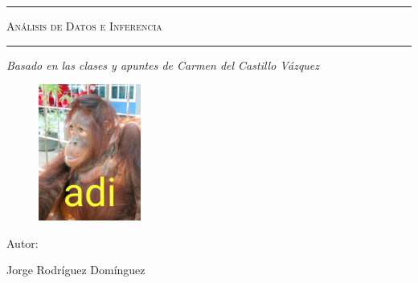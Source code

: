 \begin{titlepage}
    \centering
    {\bfseries\LARGE \ \par}
    \vspace{1cm}
    {\scshape\Large \ \par}
    \vspace{3cm}
    \rule{\linewidth}{0.5mm}
    {\scshape\Huge Análisis de Datos e Inferencia\par}
    \rule{\linewidth}{0.5mm} \par
    \vspace{3cm}
    {\itshape\Large Basado en las clases y apuntes de Carmen del Castillo Vázquez \par}
    \vfill
    \begin{figure}[H]
        \centering
        \includegraphics[width=0.3\textwidth]{adilupe.jpeg}
    \end{figure}
    {\Large Autor: \par}
    {\Large Jorge Rodríguez Domínguez \par}
    \vfill
\end{titlepage}
\tableofcontents